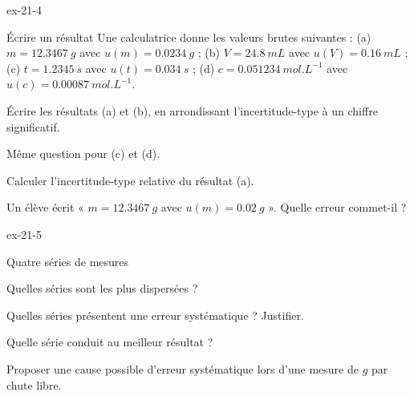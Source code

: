 \begin{blocLivre}{ex-21-4}
\begin{exercice}[1]{Écrire un résultat}
Une calculatrice donne les valeurs brutes suivantes : (a) $m=\qty{12,3467}{g}$ avec $u(m)=\qty{0,0234}{g}$ ; (b) $V=\qty{24,8}{mL}$ avec $u(V)=\qty{0,16}{mL}$ ;
(c) $t=\qty{1,2345}{s}$ avec $u(t)=\qty{0,034}{s}$ ; (d) $c=\qty{0,051234}{mol.L^{-1}}$ avec $u(c)=\qty{0,00087}{mol.L^{-1}}$.
\begin{questions}
\item Écrire les résultats (a) et (b), en arrondissant l'incertitude-type à un chiffre significatif.
\item Même question pour (c) et (d).
\item Calculer l'incertitude-type relative du résultat (a).
\item Un élève écrit « $m=\qty{12,3467}{g}$ avec $u(m)=\qty{0,02}{g}$ ». Quelle erreur commet-il ?
\end{questions}
\end{exercice}
\end{blocLivre}
\begin{blocLivre}{ex-21-5}
\begin{exercice}[1]{Quatre séries de mesures}
\begin{questions}
\item Quelles séries sont les plus dispersées ?
\item Quelles séries présentent une erreur systématique ? Justifier.
\item Quelle série conduit au meilleur résultat ?
\item Proposer une cause possible d'erreur systématique lors d'une mesure de $g$ par chute libre.
\end{questions}
\end{exercice}
\end{blocLivre}
